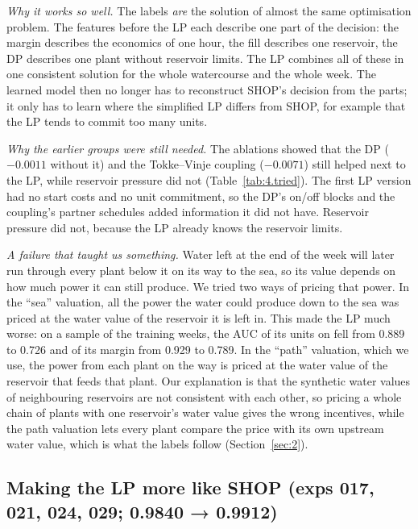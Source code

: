\emph{Why it works so well.} The labels \emph{are} the solution of almost the same optimisation problem. The features before the LP each describe one part of the decision: the margin describes the economics of one hour, the fill describes one reservoir, the DP describes one plant without reservoir limits. The LP combines all of these in one consistent solution for the whole watercourse and the whole week. The learned model then no longer has to reconstruct SHOP's decision from the parts; it only has to learn where the simplified LP differs from SHOP, for example that the LP tends to commit too many units.

\emph{Why the earlier groups were still needed.} The ablations showed that the DP ($-0.0011$ without it) and the Tokke--Vinje coupling ($-0.0071$) still helped next to the LP, while reservoir pressure did not (Table~\ref{tab:4.tried}). The first LP version had no start costs and no unit commitment, so the DP's on/off blocks and the coupling's partner schedules added information it did not have. Reservoir pressure did not, because the LP already knows the reservoir limits.

\emph{A failure that taught us something.} Water left at the end of the week will later run through every plant below it on its way to the sea, so its value depends on how much power it can still produce. We tried two ways of pricing that power. In the ``sea'' valuation, all the power the water could produce down to the sea was priced at the water value of the reservoir it is left in. This made the LP much worse: on a sample of the training weeks, the AUC of its units on fell from 0.889 to 0.726 and of its margin from 0.929 to 0.789. In the ``path'' valuation, which we use, the power from each plant on the way is priced at the water value of the reservoir that feeds that plant. Our explanation is that the synthetic water values of neighbouring reservoirs are not consistent with each other, so pricing a whole chain of plants with one reservoir's water value gives the wrong incentives, while the path valuation lets every plant compare the price with its own upstream water value, which is what the labels follow (Section~\ref{sec:2}).

\subsection{Making the LP more like SHOP (exps 017, 021, 024, 029; 0.9840 → 0.9912)}\label{sec:4.9}

